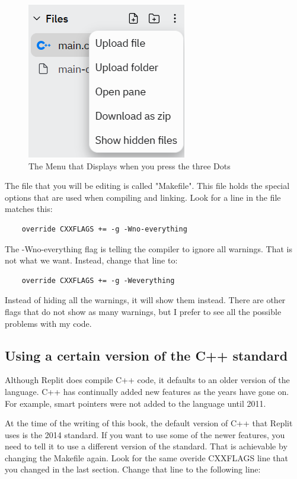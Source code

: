 \begin{figure}[h]
    \centering
    \includegraphics{images/showhidden.PNG}
    \caption{The Menu that Displays when you press the three Dots}
    \label{fig:ShowHiddenMenu}
\end{figure}

The file that you will be editing is called "Makefile". This file holds the special options that are used when compiling and linking. Look for a line in the file matches this:

\begin{verbatim}
    override CXXFLAGS += -g -Wno-everything    
\end{verbatim}

The -Wno-everything flag is telling the compiler to ignore all warnings. That is not what we want. Instead, change that line to:

\begin{verbatim}
    override CXXFLAGS += -g -Weverything
\end{verbatim}

Instead of hiding all the warnings, it will show them instead. There are other flags that do not show as many warnings, but I prefer to see all the possible problems with my code.

\subsection{Using a certain version of the C++ standard}
\label{changestandard}
Although Replit does compile C++ code, it defaults to an older version of the language. C++ has continually added new features as the years have gone on. For example, smart pointers were not added to the language until 2011.

At the time of the writing of this book, the default version of C++ that Replit uses is the 2014 standard. If you want to use some of the newer features, you need to tell it to use a different version of the standard. That is achievable by changing the Makefile again. Look for the same overide CXXFLAGS line that you changed in the last section. Change that line to the following line:

